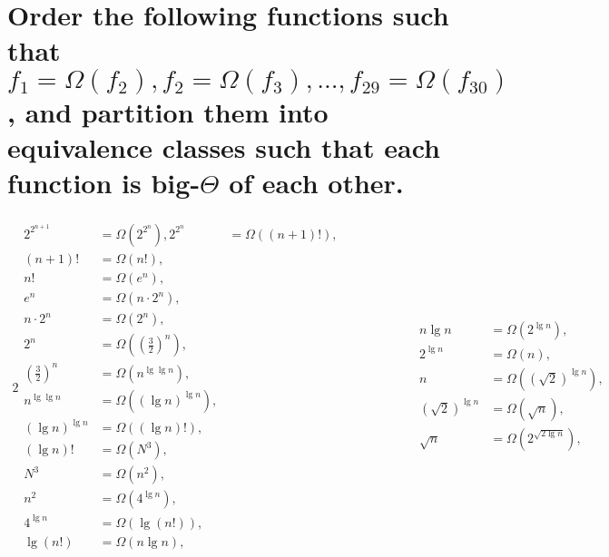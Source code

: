 \section[Problem 6]{Order the following functions such that $f_1 = \Omega(f_2), f_2 = \Omega(f_3), ..., f_{29} = \Omega(f_{30})$, and partition them into equivalence classes such that each function is big-$\Theta$ of each other.}

\begin{alignat*}{2}
	\begin{aligned}
		2^{2^{n + 1}} &= \Omega \left(2^{2^n} \right),
		2^{2^n} &= \Omega \left((n + 1)! \right), \\
		(n + 1)! &= \Omega \left(n! \right), \\
		n! &= \Omega \left(e^n \right), \\
		e^n &= \Omega \left(n \cdot 2^n \right), \\
		n \cdot 2^n &= \Omega \left(2^n \right), \\
		2^n &= \Omega \left(\left( \frac{3}{2} \right)^n \right), \\
		\left( \frac{3}{2} \right)^n &= \Omega \left(n^{\lg \lg n} \right), \\
		n^{\lg \lg n} &= \Omega \left(\left( \lg n \right)^{\lg n} \right), \\
		\left( \lg n \right)^{\lg n} &= \Omega \left((\lg n)! \right), \\
		(\lg n)! &= \Omega \left(N^3 \right), \\
		N^3 &= \Omega \left(n^2 \right), \\
		n^2 &= \Omega \left(4^{\lg n} \right), \\
		4^{\lg n} &= \Omega \left(\lg (n!) \right), \\
		\lg (n!)  &= \Omega \left(n \lg n \right), \\
	\end{aligned}
	& \qquad \qquad &
	\begin{aligned}
		n \lg n &= \Omega \left(2^{\lg n} \right), \\
		2^{\lg n} &= \Omega \left(n \right), \\
		n &= \Omega \left(\left( \sqrt{2} \right)^{\lg n} \right), \\
		\left( \sqrt{2} \right)^{\lg n} &= \Omega \left(\sqrt{n} \right), \\
		\sqrt{n} &= \Omega \left(2^{\sqrt{2 \lg n}} \right), \\

\end{aligned}
\end{alignat*}
